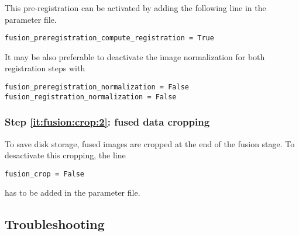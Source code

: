 This pre-registration can be activated by adding the following line in the parameter file.
\begin{verbatim}
fusion_preregistration_compute_registration = True
\end{verbatim}
It may be also preferable to  deactivate the image normalization for both registration steps with
\begin{verbatim}
fusion_preregistration_normalization = False
fusion_registration_normalization = False
\end{verbatim}



\subsubsection{Step \ref{it:fusion:crop:2}: fused data cropping}
\label{sec:cli:fuse:fused:data:cropping}

To save disk storage, fused images are cropped at the end of the fusion stage. To desactivate this cropping, the line
\begin{verbatim}
fusion_crop = False
\end{verbatim}
has to be added in the parameter file.

\subsection{Troubleshooting}

